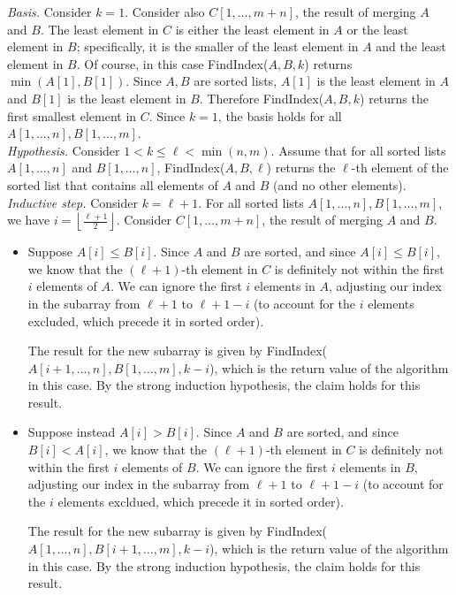 \begin{solution}
\begin{itemize}
\textit{Basis. }Consider $k=1$. Consider also $C[1,\dots,m+n]$, the result of merging $A$ and $B$. The least element in $C$ is either the least element in $A$ or the least element in $B$; specifically, it is the smaller of the least element in $A$ and the least element in $B$. Of course, in this case {\sc FindIndex}($A,B,k$) returns $\min(A[1],B[1])$. Since $A,B$ are sorted lists, $A[1]$ is the least element in $A$ and $B[1]$ is the least element in $B$. Therefore {\sc FindIndex}($A,B,k$) returns the first smallest element in $C$. Since $k=1$, the basis holds for all $A[1,\dots,n],B[1,\dots,m]$.\\

\textit{Hypothesis. }Consider $1<k\leq\ell<\min(n,m)$. Assume that for all sorted lists $A[1,\dots,n]$ and $B[1,\dots,n]$, {\sc FindIndex}($A,B,\ell$) returns the $\ell$-th element of the sorted list that contains all elements of $A$ and $B$ (and no other elements).\\

\textit{Inductive step. }Consider $k=\ell+1$. For all sorted lists $A[1,\dots,n],B[1,\dots,m]$, we have $i=\left\lfloor\frac{\ell+1}{2}\right\rfloor$. Consider $C[1,\dots,m+n]$, the result of merging $A$ and $B$.
\begin{itemize}
\item Suppose $A[i]\leq B[i]$. Since $A$ and $B$ are sorted, and since $A[i]\leq B[i]$, we know that the $(\ell+1)$-th element in $C$ is definitely not within the first $i$ elements of $A$. We can ignore the first $i$ elements in $A$, adjusting our index in the subarray from $\ell+1$ to $\ell+1-i$ (to account for the $i$ elements excluded, which precede it in sorted order).

The result for the new subarray is given by {\sc FindIndex}($A[i+1,\dots,n],B[1,\dots,m],k-i$), which is the return value of the algorithm in this case. By the strong induction hypothesis, the claim holds for this result.
\item Suppose instead $A[i]>B[i]$. Since $A$ and $B$ are sorted, and since $B[i]<A[i]$, we know that the $(\ell+1)$-th element in $C$ is definitely not within the first $i$ elements of $B$. We can ignore the first $i$ elements in $B$, adjusting our index in the subarray from $\ell+1$ to $\ell+1-i$ (to account for the $i$ elements excldued, which precede it in sorted order).

The result for the new subarray is given by {\sc FindIndex}($A[1,\dots,n],B[i+1,\dots,m],k-i$), which is the return value of the algorithm in this case. By the strong induction hypothesis, the claim holds for this result.
\end{itemize}


\end{itemize}
\end{solution}
